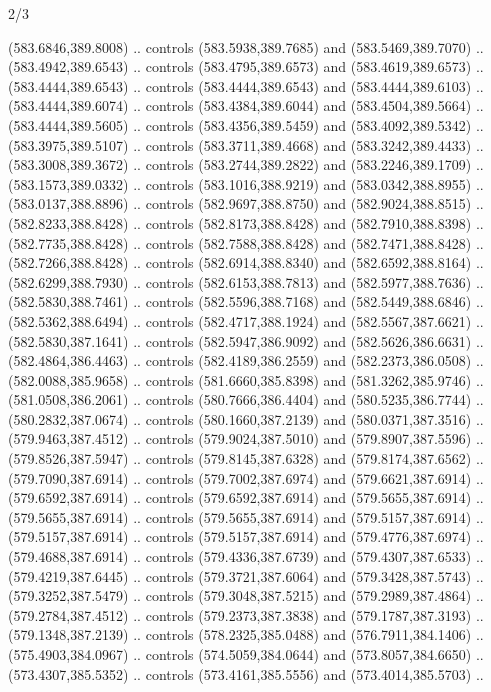 \begin{flagdescription}{2/3}
\begin{scope}[xshift=0.5\flaglength,yshift=0.5\flagwidth,scale=\flagwidth/495.65]
\begin{scope}[y=0.8pt, x=0.8pt, yscale=-1,shift={(-463.76,-309.78)}]
  (583.6846,389.8008) .. controls (583.5938,389.7685) and (583.5469,389.7070) ..
  (583.4942,389.6543) .. controls (583.4795,389.6573) and (583.4619,389.6573) ..
  (583.4444,389.6543) .. controls (583.4444,389.6543) and (583.4444,389.6103) ..
  (583.4444,389.6074) .. controls (583.4384,389.6044) and (583.4504,389.5664) ..
  (583.4444,389.5605) .. controls (583.4356,389.5459) and (583.4092,389.5342) ..
  (583.3975,389.5107) .. controls (583.3711,389.4668) and (583.3242,389.4433) ..
  (583.3008,389.3672) .. controls (583.2744,389.2822) and (583.2246,389.1709) ..
  (583.1573,389.0332) .. controls (583.1016,388.9219) and (583.0342,388.8955) ..
  (583.0137,388.8896) .. controls (582.9697,388.8750) and (582.9024,388.8515) ..
  (582.8233,388.8428) .. controls (582.8173,388.8428) and (582.7910,388.8398) ..
  (582.7735,388.8428) .. controls (582.7588,388.8428) and (582.7471,388.8428) ..
  (582.7266,388.8428) .. controls (582.6914,388.8340) and (582.6592,388.8164) ..
  (582.6299,388.7930) .. controls (582.6153,388.7813) and (582.5977,388.7636) ..
  (582.5830,388.7461) .. controls (582.5596,388.7168) and (582.5449,388.6846) ..
  (582.5362,388.6494) .. controls (582.4717,388.1924) and (582.5567,387.6621) ..
  (582.5830,387.1641) .. controls (582.5947,386.9092) and (582.5626,386.6631) ..
  (582.4864,386.4463) .. controls (582.4189,386.2559) and (582.2373,386.0508) ..
  (582.0088,385.9658) .. controls (581.6660,385.8398) and (581.3262,385.9746) ..
  (581.0508,386.2061) .. controls (580.7666,386.4404) and (580.5235,386.7744) ..
  (580.2832,387.0674) .. controls (580.1660,387.2139) and (580.0371,387.3516) ..
  (579.9463,387.4512) .. controls (579.9024,387.5010) and (579.8907,387.5596) ..
  (579.8526,387.5947) .. controls (579.8145,387.6328) and (579.8174,387.6562) ..
  (579.7090,387.6914) .. controls (579.7002,387.6974) and (579.6621,387.6914) ..
  (579.6592,387.6914) .. controls (579.6592,387.6914) and (579.5655,387.6914) ..
  (579.5655,387.6914) .. controls (579.5655,387.6914) and (579.5157,387.6914) ..
  (579.5157,387.6914) .. controls (579.5157,387.6914) and (579.4776,387.6974) ..
  (579.4688,387.6914) .. controls (579.4336,387.6739) and (579.4307,387.6533) ..
  (579.4219,387.6445) .. controls (579.3721,387.6064) and (579.3428,387.5743) ..
  (579.3252,387.5479) .. controls (579.3048,387.5215) and (579.2989,387.4864) ..
  (579.2784,387.4512) .. controls (579.2373,387.3838) and (579.1787,387.3193) ..
  (579.1348,387.2139) .. controls (578.2325,385.0488) and (576.7911,384.1406) ..
  (575.4903,384.0967) .. controls (574.5059,384.0644) and (573.8057,384.6650) ..
  (573.4307,385.5352) .. controls (573.4161,385.5556) and (573.4014,385.5703) ..

\end{scope}
\end{scope}
\end{flagdescription}
